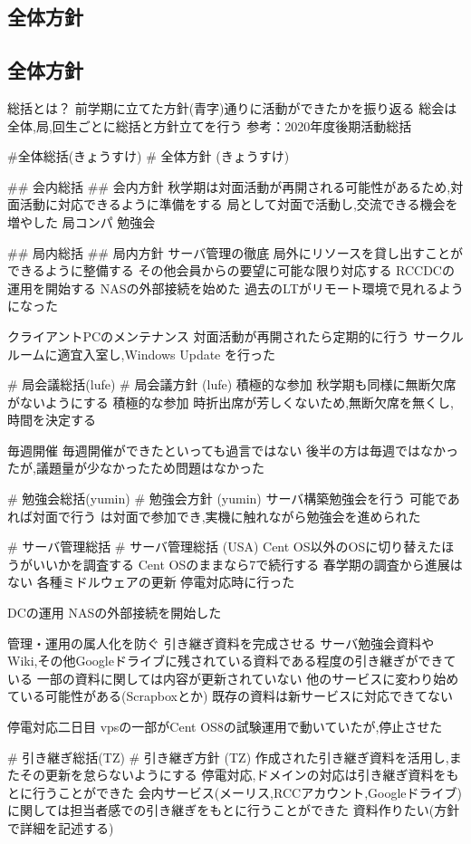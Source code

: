 \subsection*{全体方針}
\subsection*{全体方針}

総括とは？
前学期に立てた方針(青字)通りに活動ができたかを振り返る
総会は全体,局,回生ごとに総括と方針立てを行う
参考：2020年度後期活動総括

#全体総括(きょうすけ)
# 全体方針 (きょうすけ)

## 会内総括
## 会内方針
秋学期は対面活動が再開される可能性があるため,対面活動に対応できるように準備をする
局として対面で活動し,交流できる機会を増やした
局コンパ
勉強会

## 局内総括
## 局内方針
サーバ管理の徹底
局外にリソースを貸し出すことができるように整備する
その他会員からの要望に可能な限り対応する
RCCDCの運用を開始する
NASの外部接続を始めた
過去のLTがリモート環境で見れるようになった


クライアントPCのメンテナンス
対面活動が再開されたら定期的に行う
サークルルームに適宜入室し,Windows Update を行った

# 局会議総括(lufe)
# 局会議方針 (lufe)
積極的な参加
秋学期も同様に無断欠席がないようにする
積極的な参加
時折出席が芳しくないため,無断欠席を無くし,時間を決定する

毎週開催
毎週開催ができたといっても過言ではない
後半の方は毎週ではなかったが,議題量が少なかったため問題はなかった

# 勉強会総括(yumin)
# 勉強会方針 (yumin)
サーバ構築勉強会を行う
可能であれば対面で行う
\firstGrade{}は対面で参加でき,実機に触れながら勉強会を進められた

# サーバ管理総括
# サーバ管理総括 (USA)
Cent OS以外のOSに切り替えたほうがいいかを調査する
Cent OSのままなら7で続行する
春学期の調査から進展はない
各種ミドルウェアの更新
停電対応時に行った

DCの運用
NASの外部接続を開始した

管理・運用の属人化を防ぐ
引き継ぎ資料を完成させる
サーバ勉強会資料やWiki,その他Googleドライブに残されている資料である程度の引き継ぎができている
一部の資料に関しては内容が更新されていない
他のサービスに変わり始めている可能性がある(Scrapboxとか)
既存の資料は新サービスに対応できてない

停電対応二日目
vpsの一部がCent OS8の試験運用で動いていたが,停止させた

# 引き継ぎ総括(TZ)
# 引き継ぎ方針 (TZ)
作成された引き継ぎ資料を活用し,またその更新を怠らないようにする
停電対応,ドメインの対応は引き継ぎ資料をもとに行うことができた
会内サービス(メーリス,RCCアカウント,Googleドライブ)に関しては担当者感での引き継ぎをもとに行うことができた
資料作りたい(方針で詳細を記述する)

